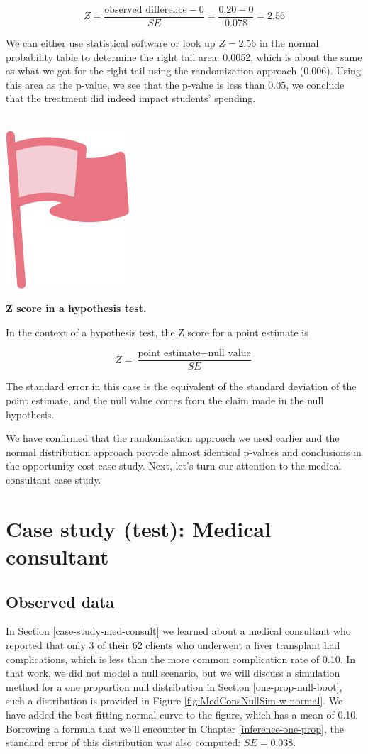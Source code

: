 \documentclass[
  10pt,
  openany]{book}
\newenvironment{mdframedwithfootImportant}
{   
    \savenotes
    \begin{mdframed}[%
    topline=true, bottomline=true, linecolor=oiR, linewidth=0.5pt,
    rightline=false, leftline=false,
    backgroundcolor=oiLGray]
    \renewcommand{\thempfootnote}{\arabic{footnote}}
    }
{
    \end{mdframed}
    \spewnotes
}
\newenvironment{important}{
    \let\oldtextbf\textbf
    \renewcommand{\textbf}[1]{{\textcolor{oiR}{\oldtextbf{##1}}}}
\vspace{4mm}
\begin{mdframedwithfootImportant}
\begin{minipage}[t]{0.10\textwidth}
{$\:$ \\ \setkeys{Gin}{width=2.5em,keepaspectratio}\includegraphics{images/_icons/important.png}}
\end{minipage}
\hfill
\begin{minipage}[t]{0.90\textwidth}
\vspace{-2mm}
\setlength{\parskip}{1em}
}{\end{minipage}
\end{mdframedwithfootImportant}
\vspace{4mm}
}
\begin{document}
\[Z = \frac{\text{observed difference} - 0}{SE} = \frac{0.20 - 0}{0.078} = 2.56\]

We can either use statistical software or look up \(Z = 2.56\) in the normal probability table to determine the right tail area: 0.0052, which is about the same as what we got for the right tail using the randomization approach (0.006).
Using this area as the p-value, we see that the p-value is less than 0.05, we conclude that the treatment did indeed impact students' spending.

\begin{important}
\textbf{Z score in a hypothesis test.}

In the context of a hypothesis test, the Z score for a point estimate is

\[Z = \frac{\text{point estimate} - \text{null value}}{SE}\]

The standard error in this case is the equivalent of the standard deviation of the point estimate, and the null value comes from the claim made in the null hypothesis.

\end{important}

We have confirmed that the randomization approach we used earlier and the normal distribution approach provide almost identical p-values and conclusions in the opportunity cost case study.
Next, let's turn our attention to the medical consultant case study.

\hypertarget{casemed}{%
\section{Case study (test): Medical consultant}\label{casemed}}

\hypertarget{observed-data-5}{%
\subsection{Observed data}\label{observed-data-5}}

In Section \ref{case-study-med-consult} we learned about a medical consultant who reported that only 3 of their 62 clients who underwent a liver transplant had complications, which is less than the more common complication rate of 0.10.
In that work, we did not model a null scenario, but we will discuss a simulation method for a one proportion null distribution in Section \ref{one-prop-null-boot}, such a distribution is provided in Figure \ref{fig:MedConsNullSim-w-normal}.
We have added the best-fitting normal curve to the figure, which has a mean of 0.10.
Borrowing a formula that we'll encounter in Chapter \ref{inference-one-prop}, the standard error of this distribution was also computed: \(SE = 0.038.\)
\end{document}
